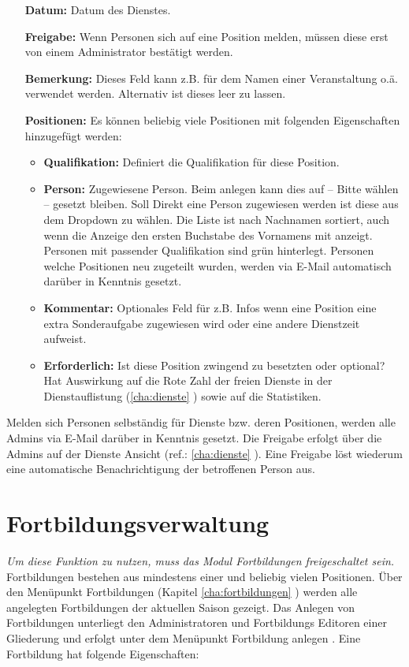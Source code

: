 \begin{itemize}
	\item[\textbf{Datum:}] Datum des Dienstes.
	\item[\textbf{Freigabe:}] Wenn Personen sich auf eine Position melden, müssen diese erst von einem Administrator bestätigt werden.
	\item[\textbf{Bemerkung:}] Dieses Feld kann z.B. für dem Namen einer Veranstaltung o.ä. verwendet werden. Alternativ ist dieses leer zu lassen.
	\item[\textbf{Positionen:}] Es können beliebig viele Positionen mit folgenden Eigenschaften hinzugefügt werden:
	\begin{itemize}
		\item \textbf{Qualifikation:} Definiert die Qualifikation für diese Position.
		\item \textbf{Person:} Zugewiesene Person. Beim anlegen kann dies auf \glqq -- Bitte wählen -- \grqq{} gesetzt bleiben. Soll Direkt eine Person zugewiesen werden ist diese aus dem Dropdown zu wählen. Die Liste ist nach Nachnamen sortiert, auch wenn die Anzeige den ersten Buchstabe des Vornamens mit anzeigt. Personen mit passender Qualifikation sind grün hinterlegt. Personen welche Positionen neu zugeteilt wurden, werden via E-Mail automatisch darüber in Kenntnis gesetzt.
		\item \textbf{Kommentar:} Optionales Feld für z.B. Infos wenn eine Position eine extra Sonderaufgabe zugewiesen wird oder eine andere Dienstzeit aufweist.
		\item \textbf{Erforderlich:} Ist diese Position zwingend zu besetzten oder optional? Hat Auswirkung auf die Rote Zahl der freien Dienste in der Dienstauflistung (\ref{cha:dienste} ) sowie auf die Statistiken.
	\end{itemize}
\end{itemize}
Melden sich Personen selbständig für Dienste bzw. deren Positionen, werden alle Admins via E-Mail darüber in Kenntnis gesetzt. Die Freigabe erfolgt über die Admins auf der Dienste Ansicht (ref.: \ref{cha:dienste} ). Eine Freigabe löst wiederum eine automatische Benachrichtigung der betroffenen Person aus.

\section{Fortbildungsverwaltung}
\label{sec:admin_training}
\textit{{\small Um diese Funktion zu nutzen, muss das Modul Fortbildungen freigeschaltet sein.}}
Fortbildungen bestehen aus mindestens einer und beliebig vielen Positionen. Über den Menüpunkt Fortbildungen (Kapitel \ref{cha:fortbildungen} ) werden alle angelegten Fortbildungen der aktuellen Saison gezeigt. Das Anlegen von Fortbildungen unterliegt den Administratoren und Fortbildungs Editoren einer Gliederung und erfolgt unter dem Menüpunkt \glqq Fortbildung anlegen \grqq{}. Eine Fortbildung hat folgende Eigenschaften:

